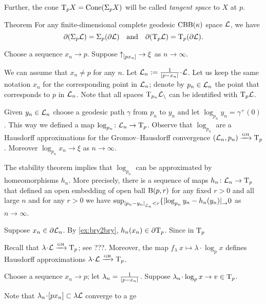 Further, the cone $\mathrm{T}_pX=\mathop{\rm Cone}\nolimits(\Sigma_pX)$ will be called \emph{tangent space} to $X$ at $p$.

\begin{thm}{Theorem}\label{thm:partial-Sigma}
For any finite-dimensional complete geodesic $\mathrm{CBB}(\kappa)$ space $\mathcal{L}$, we have
\[\partial (\Sigma_p\mathcal{L})=\Sigma_p(\partial\mathcal{L})
\quad\text{and}\quad
\partial(\mathrm{T}_p\mathcal{L})=\mathrm{T}_p(\partial\mathcal{L}).\]
\end{thm}

Choose a sequence $x_n\to p$.
Suppose ${\uparrow}_{[{p}{x_n}]}\to\xi$ as $n\to\infty$.

We can assume that $x_n\ne p$ for any $n$.
Let $\spc{L}_n\df \tfrac1{\dist{p}{x_n}{}}\cdot\spc{L}$.
Let us keep the same notation $x_n$ for the corresponding point in $\mathcal{L}_n$;
denote by $p_n\in \mathcal{L}_n$ the point that corresponds to $p$ in  $\mathcal{L}_n$.
Note that all spaces $\mathrm{T}_{p_n}\mathcal{L_n}$ can be identified with $\mathrm{T}_p\mathcal{L}$.

Given $y_n\in \mathcal{L}_n$ choose a geodesic path $\gamma$ from $p_n$ to $y_n$
and let $\log_{p_n}y_n=\gamma^+(0)$.
This way we defined a map $\log_{p_n}\colon\mathcal{L}_n\to \mathrm{T}_p$.
Observe that $\log_{p_n}$ are a Hausdorff approximations for the Gromov--Hausdorff convergence 
$(\mathcal{L}_n,p_n)\xrightarrow{\mbox{\tiny\rm GH}} \mathrm{T}_p$.
Moreover $\log_{p_n}x_n\to \xi$ as $n\to \infty$.

The stability theorem implies that $\log_{p_n}$ can be approximated by homeomorphisms $h_n$.
More precisely, there is a sequence of maps $h_n\colon\mathcal{L}_n\to \mathrm{T}_p$
that defined an open embedding of open ball $\mathrm{B}{}(p,r)$ for any fixed $r>0$ and all large $n$
and for any $r>0$ we have $\sup_{\dist{p_n}{y_n}{\spc{L}_n}<r}\{\dist{\log_{p_n}y_n}{h_n(y_n)}\to 0$ as $n\to\infty$.

Suppose $x_n\in \partial\mathcal{L}_n$.
By \ref{ex:bry2bry}, $h_n(x_n)\in\partial \mathrm{T}_p$.
Since in $\mathrm{T}_p$

Recall that $\lambda\cdot \spc{L}\GHto \T_p$; see ???.
Moreover, the map $f_\lambda\:x\mapsto \lambda\cdot\log_px$ defines Hausdorff approximations $\lambda\cdot \spc{L}\GHto \T_p$.

 

Choose a sequence $x_n\to p$;
let $\lambda_n=\tfrac1{\dist{p}{x_n}{}}$.
Suppose $\lambda_n\cdot \log_px\to v\in\T_p$.



Note that $\lambda_n\cdot [p x_n]\subset \lambda\spc{L}$ converge to a ge

\qeds

